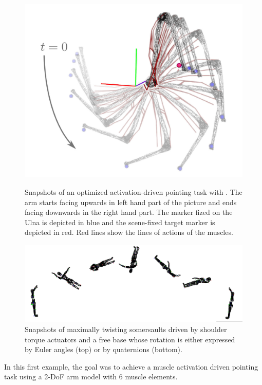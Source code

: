 %
\begin{figure}[t!]
\centering
\includegraphics[width=\columnwidth]{figures/activation_pointing.jpeg}\\
\caption{Snapshots of an optimized activation-driven pointing task with \acados. The arm starts facing upwards in left hand part of the picture and ends facing downwards in the right hand part. The marker fized on the Ulna is depicted in blue and the scene-fixed target marker is depicted in red. Red lines show the lines of actions of the muscles.}
\label{fig:snapshots_activation_driven_pointing}
\end{figure}
\begin{figure}[t!]
\centering
\includegraphics[width=\textwidth]{figures/Euler_Bioptim_MaxVrille_dos_7frames.png}
\caption{Snapshots of maximally twisting somersaults driven by shoulder torque actuators and a free base whose rotation is either expressed by Euler angles (top) or by quaternions (bottom).}
\label{fig:snapshots_quaternion_base_twisting_somersault}
\end{figure}
%
In this first example, the goal was to achieve a muscle activation driven pointing task using a 2-DoF arm model with 6 muscle elements. 

